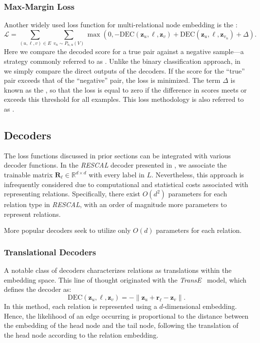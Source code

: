 \subsubsection{Max-Margin Loss}
Another widely used loss function for multi-relational node embedding is the :
\begin{equation}\label{eq:marginLoss}
    \mathcal{L} = \sum_{(u,\ell,v)\in E} \sum_{v_n\sim P_{n,u}(V)} \max(0, -\text{DEC}(\mathbf{z}_u, \ell, \mathbf{z}_v) + \text{DEC}(\mathbf{z}_u, \ell, \mathbf{z}_{v_n}) + \Delta).
\end{equation}
Here we compare the decoded score for a true pair against a negative sample—a strategy commonly referred to as . Unlike the binary classification approach, in  we  simply compare the direct outputs of the decoders. If the score for the ``true'' pair exceeds that of the ``negative'' pair, the loss is minimized. The term $ \Delta $ is known as the , so that the loss is equal to zero if the difference in scores meets or exceeds this threshold for all examples. This loss methodology is also referred to as .

\subsection{Decoders}
The loss functions discussed in prior sections can be integrated with various decoder functions. In the \textit{RESCAL} decoder presented in , we associate the trainable matrix $ \mathbf{R}_\ell\in\mathbb{R}^{d\times d} $ with every label in $ L $. Nevertheless, this approach is infrequently considered due to computational and statistical costs associated with representing relations. Specifically, there exist $ O(d^2) $ parameters for each relation type in \textit{RESCAL}, with an order of magnitude more parameters to represent relations.

More popular decoders seek to utilize only $ O(d) $ parameters for each relation. 

\subsubsection{Translational Decoders}
A notable class of decoders characterizes relations as translations within the embedding space. This line of thought originated with the \textit{TransE}~\cite{Bordes2013TransE} model, which defines the decoder as:
\begin{equation*}
    \text{DEC}(\mathbf{z}_u, \ell, \mathbf{z}_v) = -\|\mathbf{z}_u + \mathbf{r}_\ell - \mathbf{z}_v\|.
\end{equation*}
In this method, each relation is represented using a $ d $-dimensional embedding. Hence, the likelihood of an edge occurring is proportional to the distance between the embedding of the head node and the tail node, following the translation of the head node according to the relation embedding.


